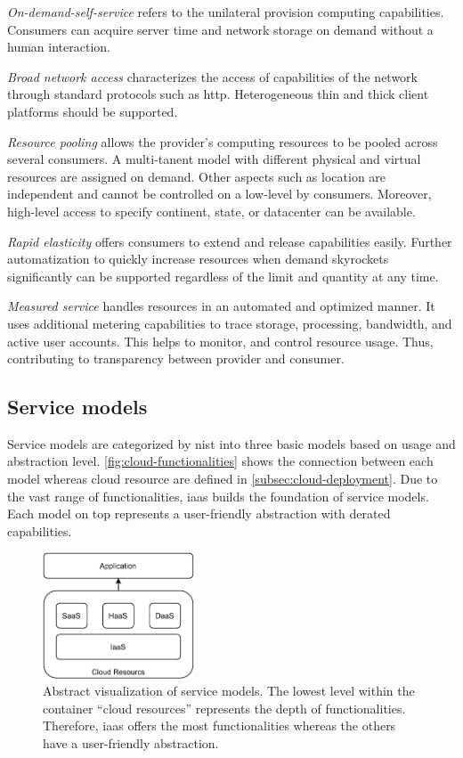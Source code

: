 \textit{On-demand-self-service} refers to the unilateral provision computing capabilities.
Consumers can acquire server time and network storage on demand without a human interaction.

\textit{Broad network access} characterizes the access of capabilities of the network through standard protocols such as \acs{http}.
Heterogeneous thin and thick client platforms should be supported.

\textit{Resource pooling} allows the provider's computing resources to be pooled across several consumers.
A multi-tanent model with different physical and virtual resources are assigned on demand.
Other aspects such as location are independent and cannot be controlled on a low-level by consumers.
Moreover, high-level access to specify continent, state, or datacenter can be available.

\textit{Rapid elasticity} offers consumers to extend and release capabilities easily.
Further automatization to quickly increase resources  when demand skyrockets significantly can be supported regardless of the limit and quantity at any time.

\textit{Measured service} handles resources in an automated and optimized manner.
It uses additional metering capabilities to trace storage, processing, bandwidth, and active user accounts.
This helps to monitor, and control resource usage. Thus, contributing to transparency between provider and consumer.

\subsection{Service models}
\label{subsec:cloud-service}

Service models are categorized by \ac{nist} into three basic models based on usage and abstraction level.
\autoref{fig:cloud-functionalities} shows the connection between each model whereas cloud resource are defined in \autoref{subsec:cloud-deployment}.
Due to the vast range of functionalities, \ac*{iaas} builds the foundation of service models.
Each model on top represents a user-friendly abstraction with derated capabilities.

\begin{figure}[ht]
    \centering
    \includegraphics[width=0.4\textwidth]{figures/cloud-service-models.pdf}
    \caption[Abstract visualization of service models]{Abstract visualization of service models. The lowest level within the container \enquote{cloud resources} represents the depth of functionalities. Therefore, \ac{iaas} offers the most functionalities whereas the others have a user-friendly abstraction.}
    \label{fig:cloud-functionalities}
\end{figure}

